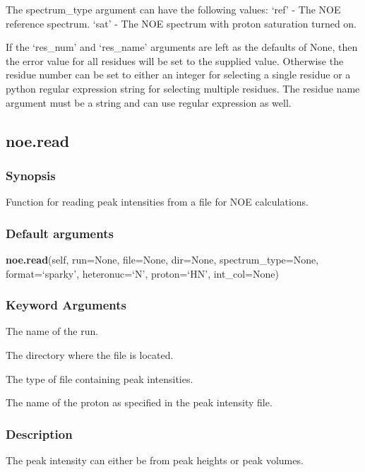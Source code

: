 The spectrum\_type argument can have the following values:
    `ref' - The NOE reference spectrum.
    `sat' - The NOE spectrum with proton saturation turned on.

If the `res\_num' and `res\_name' arguments are left as the defaults of None, then the error
value for all residues will be set to the supplied value.  Otherwise the residue number can
be set to either an integer for selecting a single residue or a python regular expression
string for selecting multiple residues.  The residue name argument must be a string and can
use regular expression as well.


\newpage

\subsection{noe.read}


\subsubsection{Synopsis}

Function for reading peak intensities from a file for NOE calculations.

\subsubsection{Default arguments}

\textsf{\textbf{noe.read}(self, run=None, file=None, dir=None, spectrum\_type=None, format=`sparky', heteronuc=`N', proton=`HN', int\_col=None)}


\subsubsection{Keyword Arguments}

  The name of the run.

  The directory where the file is located.

  The type of file containing peak intensities.

  The name of the proton as specified in the peak intensity file.


\subsubsection{Description}

The peak intensity can either be from peak heights or peak volumes.


